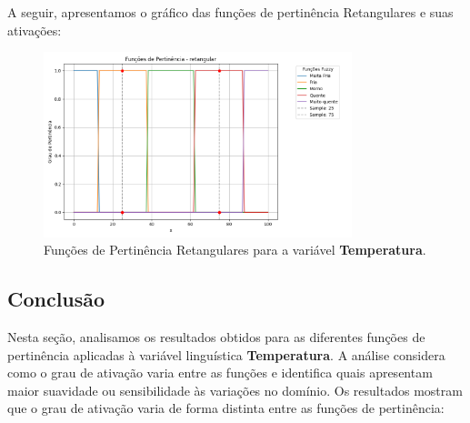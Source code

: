 \documentclass[a4paper,12pt]{article}
\begin{document}
A seguir, apresentamos o gráfico das funções de pertinência Retangulares e suas ativações:

\begin{figure}[H]
    \centering
    \includegraphics[width=0.8\textwidth]{img/funções_de_pertinência_retangular_fuzzificado.png}
    \caption{Funções de Pertinência Retangulares para a variável \textbf{Temperatura}.}
\end{figure}



\subsection{Conclusão}
Nesta seção, analisamos os resultados obtidos para as diferentes funções de pertinência aplicadas à variável linguística \textbf{Temperatura}. A análise considera como o grau de ativação varia entre as funções e identifica quais apresentam maior suavidade ou sensibilidade às variações no domínio.
Os resultados mostram que o grau de ativação varia de forma distinta entre as funções de pertinência:
\end{document}

